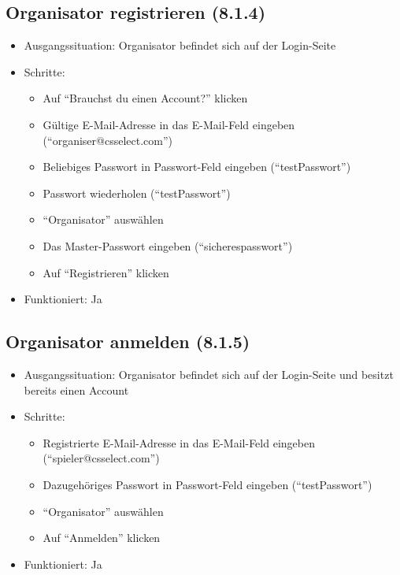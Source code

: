 \documentclass[a4paper]{scrreprt}
\begin{document}
            \subsection{Organisator registrieren (8.1.4)}
            \begin{itemize}
                \item Ausgangssituation: Organisator befindet sich auf der Login-Seite
                \item Schritte:
                    \begin{itemize}
                        \item Auf \enquote{Brauchst du einen Account?} klicken
                        \item Gültige E-Mail-Adresse in das E-Mail-Feld eingeben (\enquote{organiser@csselect.com})
                        \item Beliebiges Passwort in Passwort-Feld eingeben (\enquote{testPasswort})
                        \item Passwort wiederholen (\enquote{testPasswort})
                        \item \enquote{Organisator} auswählen
                        \item Das Master-Passwort eingeben (\enquote{sicherespasswort})
                        \item Auf \enquote{Registrieren} klicken
                    \end{itemize}
            \item Funktioniert: Ja
            \end{itemize}

            \subsection{Organisator anmelden (8.1.5)}
            \begin{itemize}
                \item Ausgangssituation: Organisator befindet sich auf der Login-Seite und besitzt bereits einen Account
                \item Schritte:
                    \begin{itemize}
                        \item Registrierte E-Mail-Adresse in das E-Mail-Feld eingeben (\enquote{spieler@csselect.com})
                        \item Dazugehöriges Passwort in Passwort-Feld eingeben (\enquote{testPasswort})
                        \item \enquote{Organisator} auswählen
                        \item Auf \enquote{Anmelden} klicken
                    \end{itemize}
                \item Funktioniert: Ja
            \end{itemize}
\end{document}
